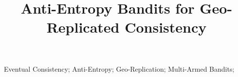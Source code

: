 \documentclass[10pt, conference, compsocconf]{IEEEtran}
\begin{document}
%
\title{\huge Anti-Entropy Bandits for Geo-Replicated Consistency}

\author{
}

\maketitle

\begin{abstract}
    
\end{abstract}

\begin{IEEEkeywords}
Eventual Consistency; Anti-Entropy; Geo-Replication; Multi-Armed Bandits;
\end{IEEEkeywords}






\end{document}
